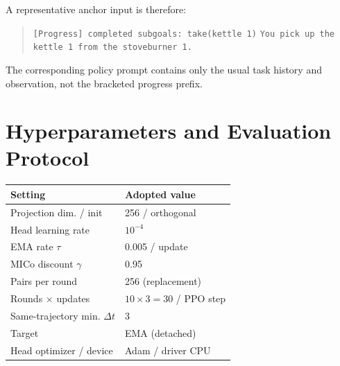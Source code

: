 A representative anchor input is therefore:
\begin{quote}\small
\texttt{[Progress] completed subgoals: take(kettle 1)}\newline
\texttt{You pick up the kettle 1 from the stoveburner 1.}
\end{quote}
The corresponding policy prompt contains only the usual task history and observation, not the bracketed progress prefix.

\section{Hyperparameters and Evaluation Protocol}
\label{app:hyperparams}

\noindent\begin{minipage}{\columnwidth}
\centering
{}
\label{tab:head_hparams}
\small
\renewcommand{\arraystretch}{1.15}
\begin{tabular}{@{}p{3.8cm}p{3.7cm}@{}}
\toprule
Setting & Adopted value \\
\midrule
Projection dim. / init & 256 / orthogonal \\
Head learning rate & $10^{-4}$ \\
EMA rate $\tau$ & 0.005 / update \\
MICo discount $\gamma$ & 0.95 \\
Pairs per round & 256 (replacement) \\
Rounds $\times$ updates & $10\times3=30$ / PPO step \\
Same-trajectory min. $\Delta t$ & 3 \\
Target & EMA (detached) \\
Head optimizer / device & Adam / driver CPU \\
\bottomrule
\end{tabular}
\end{minipage}

